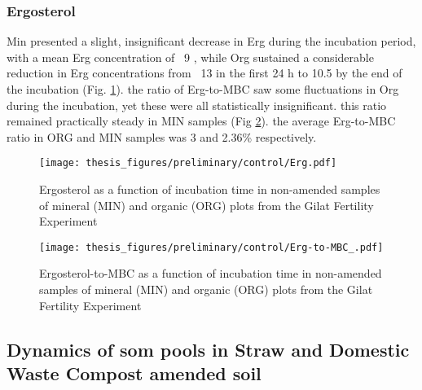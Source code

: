 \documentclass[12pt]{report}
\begin{document}
		\subsubsection{Ergosterol}
		Min presented a slight, insignificant decrease in Erg during the incubation period, with a mean Erg concentration of ~9 \genericunit, while Org sustained a considerable reduction in Erg concentrations from ~13 \genericunit in the first 24 h to 10.5 \genericunit by the end of the incubation (Fig. \ref{fig:erg_control_preliminary}). the ratio of Erg-to-MBC saw some fluctuations in Org during the incubation, yet these were all statistically insignificant. this ratio remained practically steady in MIN samples (Fig \ref{fig:erg_to_mbc_control_preliminary}). the average Erg-to-MBC ratio in ORG and MIN samples was 3 and 2.36\% respectively.
		
		\begin{figure}[H]
			\centering
			\texttt{[image: thesis\_figures/preliminary/control/Erg.pdf]}
			\caption{Ergosterol  as a function of incubation time in non-amended samples  of mineral (MIN) and organic (ORG) plots from the Gilat Fertility Experiment}
			\label{fig:erg_control_preliminary}
		\end{figure}
		
		\begin{figure}[H]
			\centering
			\texttt{[image: thesis\_figures/preliminary/control/Erg-to-MBC\_.pdf]}
			\caption{Ergosterol-to-MBC  as a function of incubation time in non-amended samples  of mineral (MIN) and organic (ORG) plots from the Gilat Fertility Experiment}
			\label{fig:erg_to_mbc_control_preliminary}
		\end{figure}
		
		\subsection{Dynamics of \gls{som} pools in Straw and Domestic Waste Compost amended soil}
		
		
\end{document}
